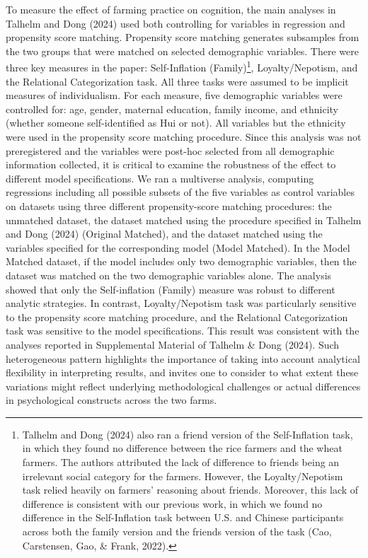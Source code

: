 \documentclass[
  man]{apa6}
\begin{document}
To measure the effect of farming practice on cognition, the main analyses in Talhelm and Dong (2024) used both controlling for variables in regression and propensity score matching. Propensity score matching generates subsamples from the two groups that were matched on selected demographic variables. There were three key measures in the paper: Self-Inflation (Family)\footnote{Talhelm and Dong (2024) also ran a friend version of the Self-Inflation task, in which they found no difference between the rice farmers and the wheat farmers. The authors attributed the lack of difference to friends being an irrelevant social category for the farmers. However, the Loyalty/Nepotism task relied heavily on farmers' reasoning about friends. Moreover, this lack of difference is consistent with our previous work, in which we found no difference in the Self-Inflation task between U.S. and Chinese participants across both the family version and the friends version of the task (Cao, Carstensen, Gao, \& Frank, 2022).}, Loyalty/Nepotism, and the Relational Categorization task. All three tasks were assumed to be implicit measures of individualism. For each measure, five demographic variables were controlled for: age, gender, maternal education, family income, and ethnicity (whether someone self-identified as Hui or not). All variables but the ethnicity were used in the propensity score matching procedure. Since this analysis was not preregistered and the variables were post-hoc selected from all demographic information collected, it is critical to examine the robustness of the effect to different model specifications. We ran a multiverse analysis, computing regressions including all possible subsets of the five variables as control variables on datasets using three different propensity-score matching procedures: the unmatched dataset, the dataset matched using the procedure specified in Talhelm and Dong (2024) (Original Matched), and the dataset matched using the variables specified for the corresponding model (Model Matched). In the Model Matched dataset, if the model includes only two demographic variables, then the dataset was matched on the two demographic variables alone. The analysis showed that only the Self-inflation (Family) measure was robust to different analytic strategies. In contrast, Loyalty/Nepotism task was particularly sensitive to the propensity score matching procedure, and the Relational Categorization task was sensitive to the model specifications. This result was consistent with the analyses reported in Supplemental Material of Talhelm \& Dong (2024). Such heterogeneous pattern highlights the importance of taking into account analytical flexibility in interpreting results, and invites one to consider to what extent these variations might reflect underlying methodological challenges or actual differences in psychological constructs across the two farms.
\end{document}
